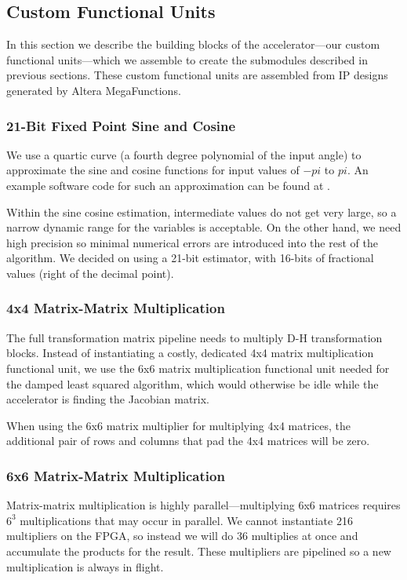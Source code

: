 \subsection{Custom Functional Units}
In this section we describe the building blocks of the accelerator---our custom functional units---which we assemble to create the submodules described in previous sections. These custom functional units are assembled from IP designs generated by Altera MegaFunctions.

\subsubsection{21-Bit Fixed Point Sine and Cosine}
We use a quartic curve (a fourth degree polynomial of the input angle) to approximate the sine and cosine functions for input values of $-pi$ to $pi$. An example software code for such an approximation can be found at \cite{ref:sincos}. 

Within the sine cosine estimation, intermediate values do not get very large, so a narrow dynamic range for the variables is acceptable. On the other hand, we need high precision so minimal numerical errors are introduced into the rest of the algorithm. We decided on using a 21-bit estimator, with 16-bits of fractional values (right of the decimal point).

\subsubsection{4x4 Matrix-Matrix Multiplication}
The full transformation matrix pipeline needs to multiply D-H transformation blocks. Instead of instantiating a costly, dedicated 4x4 matrix multiplication functional unit, we use the 6x6 matrix multiplication functional unit needed for the damped least squared algorithm, which would otherwise be idle while the accelerator is finding the Jacobian matrix.

When using the 6x6 matrix multiplier for multiplying 4x4 matrices, the additional pair of rows and columns that pad the 4x4 matrices will be zero.

\subsubsection{6x6 Matrix-Matrix Multiplication}
Matrix-matrix multiplication is highly parallel---multiplying 6x6 matrices requires $6^3$ multiplications that may occur in parallel. We cannot instantiate 216 multipliers on the FPGA, so instead we will do 36 multiplies at once and accumulate the products for the result. These multipliers are pipelined so a new multiplication is always in flight.

